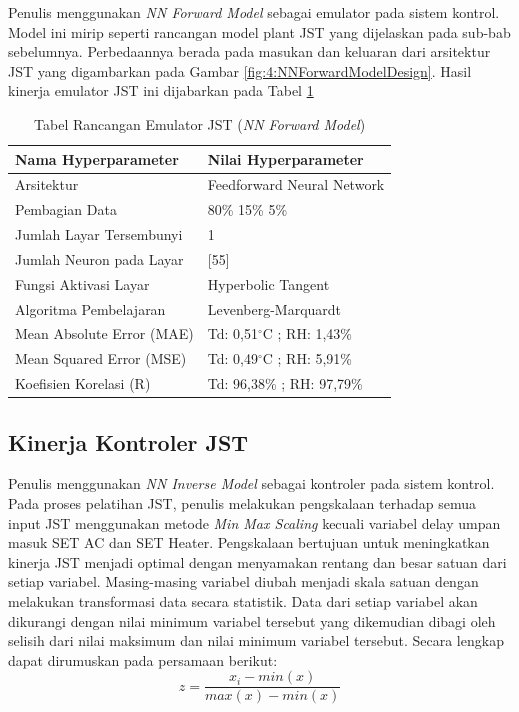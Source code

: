 Penulis menggunakan \textit{NN Forward Model} sebagai emulator pada sistem kontrol. Model ini mirip seperti rancangan model plant JST yang dijelaskan pada sub-bab sebelumnya. Perbedaannya berada pada masukan dan keluaran dari arsitektur JST yang digambarkan pada Gambar \ref{fig:4:NNForwardModelDesign}. Hasil kinerja emulator JST ini dijabarkan pada Tabel \ref{tbl:5:NNEmulator}

\begin{table}[!hbt]
	\caption{Tabel Rancangan Emulator JST (\textit{NN Forward Model})}
	\label{tbl:5:NNEmulator}
	\centering
	\begin{tabular}{|p{5.7cm}|p{5cm}|}
		\hline
		\textbf{Nama Hyperparameter} & \textbf{Nilai Hyperparameter} \\ \hline
		Arsitektur & Feedforward Neural Network \\ \hline
		Pembagian Data & 80\% 15\% 5\% \\ \hline 
		Jumlah Layar Tersembunyi & 1 \\ \hline
		Jumlah Neuron pada Layar & [55] \\ \hline
		Fungsi Aktivasi Layar & Hyperbolic Tangent \\ \hline
		Algoritma Pembelajaran & Levenberg-Marquardt \\ \hline
		Mean Absolute Error (MAE) & Td: 0,51$^\circ$C ; RH: 1,43\% \\ \hline
		Mean Squared Error (MSE) & Td: 0,49$^\circ$C ; RH: 5,91\% \\ \hline
		Koefisien Korelasi (R) & Td: 96,38\% ; RH: 97,79\% \\ \hline
	\end{tabular}
\end{table}

\subsection{Kinerja Kontroler JST}

Penulis menggunakan \textit{NN Inverse Model} sebagai kontroler pada sistem kontrol. Pada proses pelatihan JST, penulis melakukan pengskalaan terhadap semua input JST menggunakan metode \textit{Min Max Scaling} kecuali variabel delay umpan masuk SET AC dan SET Heater. Pengskalaan bertujuan untuk meningkatkan kinerja JST menjadi optimal dengan menyamakan rentang dan besar satuan dari setiap variabel. Masing-masing variabel diubah menjadi skala satuan dengan melakukan transformasi data secara statistik. Data dari setiap variabel akan dikurangi dengan nilai minimum variabel tersebut yang dikemudian dibagi oleh selisih dari nilai maksimum dan nilai minimum variabel tersebut. Secara lengkap dapat dirumuskan pada persamaan berikut:
\begin{equation} \label{eq:5:MinMaxScaler}
z = \frac{x_i - min(x)}{max(x) - min(x)}
\end{equation}

